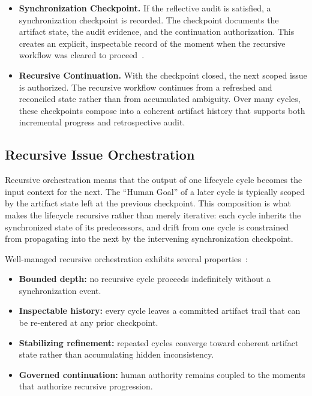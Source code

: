 \begin{itemize}
  \item \textbf{Synchronization Checkpoint.} If the reflective audit is satisfied, a synchronization checkpoint is recorded. The checkpoint documents the artifact state, the audit evidence, and the continuation authorization. This creates an explicit, inspectable record of the moment when the recursive workflow was cleared to proceed~\cite{Chandy1985DistributedSnapshots}.

  \item \textbf{Recursive Continuation.} With the checkpoint closed, the next scoped issue is authorized. The recursive workflow continues from a refreshed and reconciled state rather than from accumulated ambiguity. Over many cycles, these checkpoints compose into a coherent artifact history that supports both incremental progress and retrospective audit.
\end{itemize}

\subsection{Recursive Issue Orchestration}

Recursive orchestration means that the output of one lifecycle cycle becomes the input context for the next. The ``Human Goal'' of a later cycle is typically scoped by the artifact state left at the previous checkpoint. This composition is what makes the lifecycle recursive rather than merely iterative: each cycle inherits the synchronized state of its predecessors, and drift from one cycle is constrained from propagating into the next by the intervening synchronization checkpoint.

Well-managed recursive orchestration exhibits several properties~\cite{Wiener1948Cybernetics,Beer1972BrainFirm}:
\begin{itemize}
  \item \textbf{Bounded depth:} no recursive cycle proceeds indefinitely without a synchronization event.
  \item \textbf{Inspectable history:} every cycle leaves a committed artifact trail that can be re-entered at any prior checkpoint.
  \item \textbf{Stabilizing refinement:} repeated cycles converge toward coherent artifact state rather than accumulating hidden inconsistency.
  \item \textbf{Governed continuation:} human authority remains coupled to the moments that authorize recursive progression.
\end{itemize}

